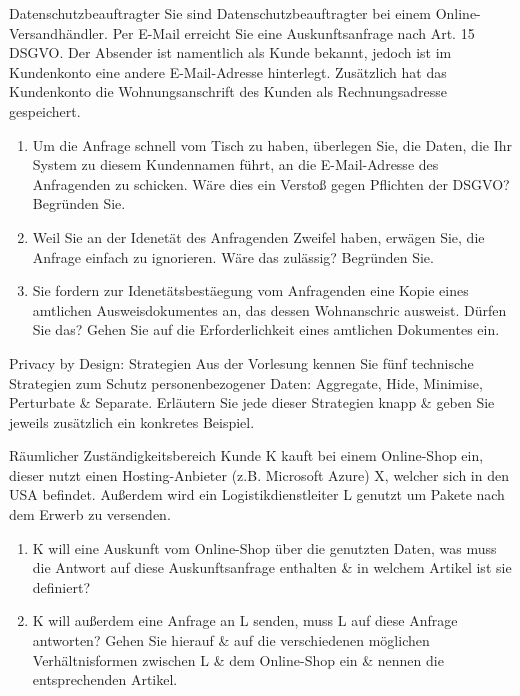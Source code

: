 \documentclass{exercisesheet}
\begin{document}
\begin{exercise*}{Datenschutzbeauftragter}
  Sie sind Datenschutzbeauftragter bei einem Online-Versandhändler. Per E-Mail erreicht Sie eine Auskunftsanfrage nach Art. 15 DSGVO. Der Absender ist namentlich als Kunde bekannt, jedoch ist im Kundenkonto eine andere E-Mail-Adresse hinterlegt. Zusätzlich hat das Kundenkonto die Wohnungsanschrift des Kunden als Rechnungsadresse gespeichert.
  \begin{enumerate}
    \item Um die Anfrage schnell vom Tisch zu haben, überlegen Sie, die Daten, die Ihr System zu diesem Kundennamen führt, an die E-Mail-Adresse des Anfragenden zu schicken. Wäre dies ein Verstoß gegen Pflichten der DSGVO? Begründen Sie.
    \item Weil Sie an der Idenetät des Anfragenden Zweifel haben, erwägen Sie, die Anfrage einfach zu ignorieren. Wäre das zulässig? Begründen Sie.
    \item Sie fordern zur Idenetätsbestäegung vom Anfragenden eine Kopie eines amtlichen Ausweisdokumentes an, das dessen Wohnanschric ausweist. Dürfen Sie das? Gehen Sie auf die Erforderlichkeit eines amtlichen Dokumentes ein.
  \end{enumerate}
\end{exercise*}

\begin{exercise*}{Privacy by Design: Strategien}
  Aus der Vorlesung kennen Sie fünf technische Strategien zum Schutz personenbezogener Daten: Aggregate, Hide, Minimise, Perturbate \& Separate.
  Erläutern Sie jede dieser Strategien knapp \& geben Sie jeweils zusätzlich ein konkretes Beispiel.
\end{exercise*}


\begin{exercise*}{Räumlicher Zuständigkeitsbereich}
  Kunde K kauft bei einem Online-Shop ein, dieser nutzt einen Hosting-Anbieter (z.B. Microsoft Azure) X, welcher sich in den USA befindet. Außerdem wird ein Logistikdienstleiter L genutzt um Pakete nach dem Erwerb zu versenden.
  \begin{enumerate}
    \item K will eine Auskunft vom Online-Shop über die genutzten Daten, was muss die Antwort auf diese Auskunftsanfrage enthalten \& in welchem Artikel ist sie definiert?
    \item K will außerdem eine Anfrage an L senden, muss L auf diese Anfrage antworten? Gehen Sie hierauf \& auf die verschiedenen möglichen Verhältnisformen zwischen L \& dem Online-Shop ein \& nennen die entsprechenden Artikel.
  \end{enumerate}
\end{exercise*}
\end{document}
